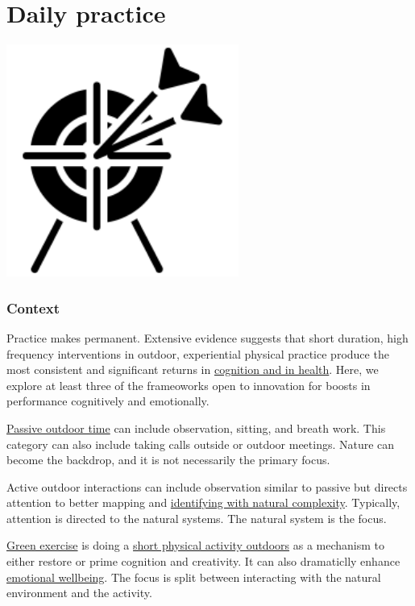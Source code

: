 \documentclass[
]{book}
\begin{document}
\hypertarget{practice}{%
\chapter{Daily practice}\label{practice}}

\includegraphics[width=3in,height=\textheight]{./practice.png}

\hypertarget{context-2}{%
\subsection*{Context}\label{context-2}}

Practice makes permanent. Extensive evidence suggests that short duration, high frequency interventions in outdoor, experiential physical practice produce the most consistent and significant returns in \href{https://www.tandfonline.com/doi/full/10.1080/02640414.2020.1794763}{cognition and in health}. Here, we explore at least three of the frameoworks open to innovation for boosts in performance cognitively and emotionally.

\href{https://www.nature.com/articles/s41598-019-44097-3}{Passive outdoor time} can include observation, sitting, and breath work. This category can also include taking calls outside or outdoor meetings. Nature can become the backdrop, and it is not necessarily the primary focus.

Active outdoor interactions can include observation similar to passive but directs attention to better mapping and \href{https://ellisonchair.tamu.edu/health-and-well-being-benefits-of-plants/}{identifying with natural complexity}. Typically, attention is directed to the natural systems. The natural system is the focus.

\href{https://www.tandfonline.com/doi/abs/10.1080/09603120500155963}{Green exercise} is doing a \href{https://pubmed.ncbi.nlm.nih.gov/22480735/}{short physical activity outdoors} as a mechanism to either restore or prime cognition and creativity. It can also dramaticlly enhance \href{https://www.mdpi.com/1660-4601/16/6/937}{emotional wellbeing}. The focus is split between interacting with the natural environment and the activity.
\end{document}
